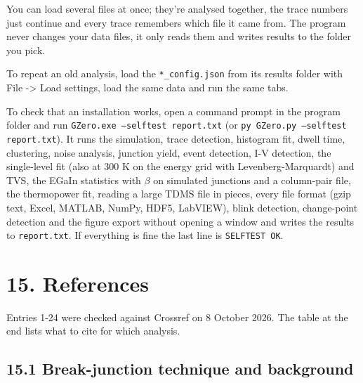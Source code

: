 \documentclass[
  11pt,
  a4paper,
]{article}
\begin{document}
You can load several files at once; they're analysed together, the trace
numbers just continue and every trace remembers which file it came from.
The program never changes your data files, it only reads them and writes
results to the folder you pick.

To repeat an old analysis, load the \texttt{*\_\allowbreak{}config.json}
from its results folder with File -\textgreater{} Load settings, load
the same data and run the same tabs.

To check that an installation works, open a command prompt in the
program folder and run \texttt{GZero.exe --selftest report.txt} (or
\texttt{py GZero.py --selftest report.txt}). It runs the simulation,
trace detection, histogram fit, dwell time, clustering, noise analysis,
junction yield, event detection, I-V detection, the single-level fit
(also at 300 K on the energy grid with Levenberg-Marquardt) and TVS, the
EGaIn statistics with $\beta$ on simulated junctions and a column-pair
file, the thermopower fit, reading a large TDMS file in pieces, every
file format (gzip text, Excel, MATLAB, NumPy, HDF5, LabVIEW), blink
detection, change-point detection and the figure export without opening
a window and writes the results to \texttt{report.txt}. If everything is
fine the last line is \texttt{SELFTEST OK}.

\hypertarget{references}{%
\section{15. References}\label{references}}

Entries 1-24 were checked against Crossref on 8 October 2026. The table
at the end lists what to cite for which analysis.

\hypertarget{break-junction-technique-and-background}{%
\subsection{15.1 Break-junction technique and
background}\label{break-junction-technique-and-background}}
\end{document}
